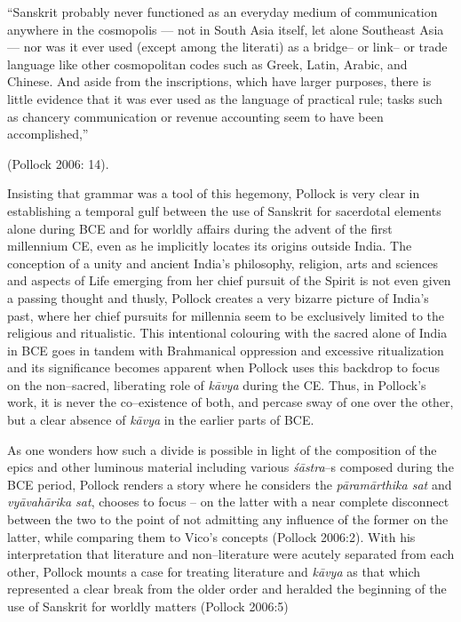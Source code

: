 \begin{myquote}
“Sanskrit probably never functioned as an everyday medium of communication anywhere in the cosmopolis — not in South Asia itself, let alone Southeast Asia — nor was it ever used (except among the literati) as a bridge– or link– or trade language like other cosmopolitan codes such as Greek, Latin, Arabic, and Chinese. And aside from the inscriptions, which have larger purposes, there is little evidence that it was ever used as the language of practical rule; tasks such as chancery communication or revenue accounting seem to have been accomplished,”
\end{myquote}

\hfill (Pollock 2006: 14).

Insisting that grammar was a tool of this hegemony, Pollock is very clear in establishing a temporal gulf between the use of Sanskrit for sacerdotal elements alone during BCE and for worldly affairs during the advent of the first millennium CE, even as he implicitly locates its origins outside India. The conception of a unity and ancient India’s philosophy, religion, arts and sciences and aspects of Life emerging from her chief pursuit of the Spirit is not even given a passing thought and thusly, Pollock creates a very bizarre picture of India’s past, where her chief pursuits for millennia seem to be exclusively limited to the religious and ritualistic. This intentional colouring with the sacred alone of India in BCE goes in tandem with Brahmanical oppression and excessive ritualization and its significance becomes apparent when Pollock uses this backdrop to focus on the non–sacred, liberating role of \textit{kāvya} during the CE. Thus, in Pollock’s work, it is never the co–existence of both, and percase sway of one over the other, but a clear absence of \textit{kāvya} in the earlier parts of BCE.

As one wonders how such a divide is possible in light of the composition of the epics and other luminous material including various \textit{śāstra}–s composed during the BCE period, Pollock renders a story where he considers the \textit{pāramārthika sat} and \textit{vyāvahārika sat}, chooses to focus – on the latter with a near complete disconnect between the two to the point of not admitting any influence of the former on the latter, while comparing them to Vico’s concepts (Pollock 2006:2). With his interpretation that literature and non–literature were acutely separated from each other, Pollock mounts a case for treating literature and \textit{kāvya} as that which represented a clear break from the older order and heralded the beginning of the use of Sanskrit for worldly matters (Pollock 2006:5)

